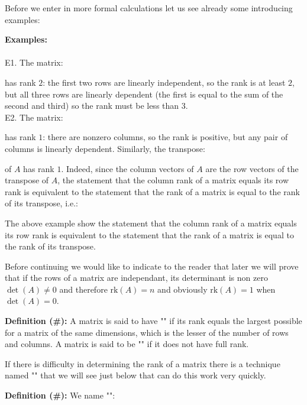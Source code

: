 	Before we enter in more formal calculations let us see already some introducing examples:
	\begin{tcolorbox}[colframe=black,colback=white,sharp corners]
	\textbf{{\Large {}}Examples:}\\\\
	E1. The matrix:
	
	has rank $2$: the first two rows are linearly independent, so the rank is at least $2$, but all three rows are linearly dependent (the first is equal to the sum of the second and third) so the rank must be less than $3$.\\
	
	E2. The matrix:
	
	has rank $1$: there are nonzero columns, so the rank is positive, but any pair of columns is linearly dependent. Similarly, the transpose:
	
	of $A$ has rank $1$. Indeed, since the column vectors of $A$ are the row vectors of the transpose of $A$, the statement that the column rank of a matrix equals its row rank is equivalent to the statement that the rank of a matrix is equal to the rank of its transpose, i.e.:
	
	\end{tcolorbox}
	The above example show the statement that the column rank of a matrix equals its row rank is equivalent to the statement that the rank of a matrix is equal to the rank of its transpose.
	
	Before continuing we would like to indicate to the reader that later we will prove that if the rows of a matrix are independant, its determinant is non zero $\det(A)\neq 0$ and therefore $\text{rk}(A)=n$ and obviously $\text{rk}(A)=1$ when $\det(A)=0$.
	
	\textbf{Definition (\#\mydef):} A matrix is said to have "" if its rank equals the largest possible for a matrix of the same dimensions, which is the lesser of the number of rows and columns. A matrix is said to be "" if it does not have full rank.
	
	\begin{tcolorbox}[title=Remark,colframe=black,arc=10pt]
	If there is difficulty in determining the rank of a matrix there is a technique named "" that we will see just below that can do this work very quickly.
	\end{tcolorbox}
	\textbf{Definition (\#\mydef):} We name "":
	
